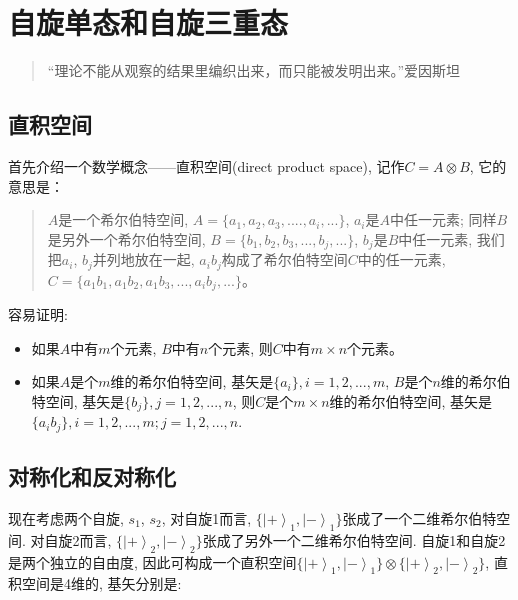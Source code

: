 \section{自旋单态和自旋三重态}

\begin{quotation}
“理论不能从观察的结果里编织出来，而只能被发明出来。”\qquad 爱因斯坦
\end{quotation}

\subsection{直积空间}


首先介绍一个数学概念——直积空间(direct product space), 记作$C=A \otimes B$, 它的意思是：

\begin{quote}
$A$是一个希尔伯特空间, $A=\{a_1, a_2, a_3, ...., a_i, ...\}$,
$a_i$是$A$中任一元素; 同样$B$是另外一个希尔伯特空间, $B=\{b_1, b_2,
b_3, ..., b_j, ...\}$, $b_j$是$B$中任一元素, 我们把$a_i$,
$b_j$并列地放在一起, $a_i b_j$构成了希尔伯特空间$C$中的任一元素, $C
= \{a_1b_1, a_1b_2, a_1b_3, ..., a_ib_j, ...\}$。
\end{quote}


容易证明:

\begin{itemize}
  \item 如果$A$中有$m$个元素, $B$中有$n$个元素, 则$C$中有$m \times
n$个元素。
  \item 如果$A$是个$m$维的希尔伯特空间, 基矢是$\{a_i\}, i=1,2,...,m$,
$B$是个$n$维的希尔伯特空间, 基矢是$\{b_j\}, j=1,2,...,n$,
则$C$是个$m \times n$维的希尔伯特空间, 基矢是$\{a_ib_j\},
i=1,2,...,m; j=1,2,...,n$.
\end{itemize}


\subsection{对称化和反对称化}

现在考虑两个自旋, $s_1$, $s_2$, 对自旋1而言, $\{ \left| {+}
\right\rangle_1  , \left| {-} \right\rangle_1
\}$张成了一个二维希尔伯特空间. 对自旋2而言, $\{ \left| {+}
\right\rangle_2  , \left| {-} \right\rangle_2
\}$张成了另外一个二维希尔伯特空间. 自旋1和自旋2是两个独立的自由度,
因此可构成一个直积空间$\{ \left| {+} \right\rangle_1  , \left| {-}
\right\rangle_1 \} \otimes \{ \left| {+} \right\rangle_2  , \left|
{-} \right\rangle_2 \}$, 直积空间是4维的, 基矢分别是:


